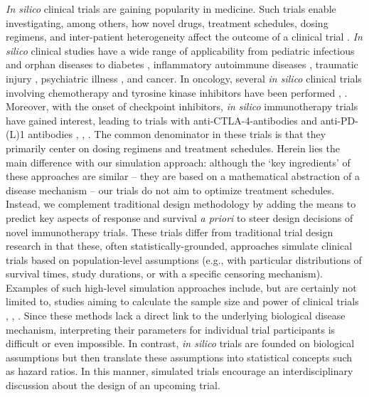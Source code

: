 \documentclass[a4paper,10pt]{article}
\begin{document}
\emph{In silico} clinical trials are gaining popularity in medicine.
Such trials enable investigating, among others, how novel drugs, treatment
schedules, dosing regimens, and inter-patient heterogeneity affect the outcome
of a clinical trial \cite{Alfonso2020}. \emph{In silico} clinical studies have a wide
range of applicability from pediatric infectious \cite{Valitalo2015} and orphan diseases
\cite{Carlier2018} to diabetes \cite{Klinke2007}, inflammatory autoimmune
diseases \cite{Schmidt2013}, traumatic injury \cite{Brown2015}, psychiatric
illness \cite{Magnusson2017}, and cancer. In oncology, several \emph{in silico}
clinical trials involving chemotherapy and tyrosine kinase inhibitors have been
performed \cite{PrezGarca2019}, \cite{Fassoni2018}. Moreover, with the onset of
checkpoint inhibitors, \emph{in silico} immunotherapy trials have gained interest,
leading to trials with anti-CTLA-4-antibodies and anti-PD-(L)1 antibodies
\cite{Jafarnejad2019}, \cite{Milberg2019}, \cite{Wang2019}. The common
denominator in these trials is that they primarily center on
dosing regimens and treatment schedules. Herein lies the main difference with
our simulation approach: although the `key ingredients' of these approaches are
similar -- they are based on a mathematical abstraction of a disease mechanism --
our trials do not aim to optimize treatment schedules. Instead, we complement
traditional design methodology by adding the means to predict key aspects of 
response and survival \emph{a priori} to steer design decisions of novel
immunotherapy trials. These trials differ from traditional trial design
research in that these, often statistically-grounded, approaches simulate
clinical trials based on population-level assumptions (e.g., with particular
distributions of survival times, study durations, or with a specific censoring
mechanism). Examples of such high-level simulation approaches include, but are
certainly not limited to, studies aiming to calculate the sample size and power
of clinical trials \cite{Bang2005}, \cite{Doostfatemeh2016}, \cite{Wilson2020}.
Since these methods lack a direct link to the underlying biological disease
mechanism, interpreting their parameters for individual trial participants is
difficult or even impossible. In contrast, \emph{in silico} trials are founded on
biological assumptions but then translate these assumptions into statistical
concepts such as hazard ratios. In this manner, simulated trials
encourage an interdisciplinary discussion about the design of an upcoming
trial.
\end{document}
